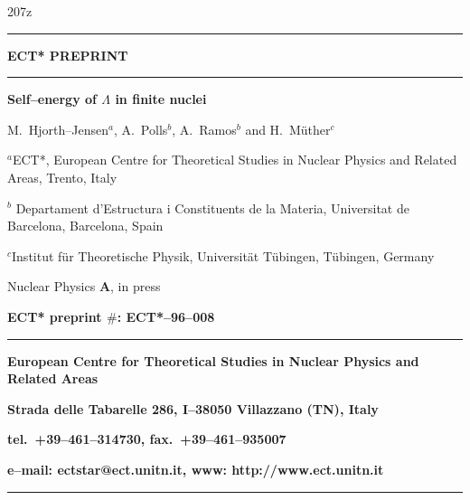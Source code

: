 


\thispagestyle{empty}
\newcommand{\HRule}{\rule{\linewidth}{1mm}}
\setlength{\parindent}{0mm}
\setlength{\parskip}{0mm}


207z   \HRule
     \begin{center}
         \Huge {\bf ECT* PREPRINT}
     \end{center}
   \HRule
   \begin{center}
      \Large {\bf Self--energy of $\Lambda$ in finite nuclei}
   \end{center}
   \begin{center}
      \large M.\ Hjorth--Jensen$^a$, A.\ Polls$^b$,
       A.\ Ramos$^b$ and H.\ M\"uther$^c$
    \end{center}
    \begin{center}
      \large   $^a$ECT*, European Centre for Theoretical
        Studies in Nuclear Physics and Related Areas,
        Trento, Italy
    \end{center}
    \begin{center}
      \large   $^b$ Departament d'Estructura i Constituents de la Materia,
       Universitat de Barcelona, Barcelona, Spain
    \end{center}
     \begin{center}
      \large $^c$Institut f\"ur Theoretische Physik, Universit\"at T\"ubingen,
        T\"ubingen, Germany
    \end{center}
    \begin{center}
      \large   Nuclear Physics {\bf A}, in press
    \end{center}
    \begin{center}
        \Large {\bf ECT* preprint $\#$: ECT*--96--008}
    \end{center}
    \begin{figure}[hbtp]
        \begin{center}
        {\centering\mbox{}}
        \end{center}
     \end{figure}
    \HRule
    \begin{center}
        \Large {\bf European Centre for Theoretical Studies in Nuclear
        Physics and Related Areas}
    \end{center}
    \begin{center}
        {\bf Strada delle Tabarelle 286, I--38050 Villazzano (TN),
        Italy}
    \end{center}
    \begin{center}
        {\bf tel.\ +39--461--314730, fax.\ +39--461--935007}
    \end{center}
     \begin{center}
        {\bf e--mail: ectstar@ect.unitn.it, www: http://www.ect.unitn.it}
    \end{center}
    \HRule




